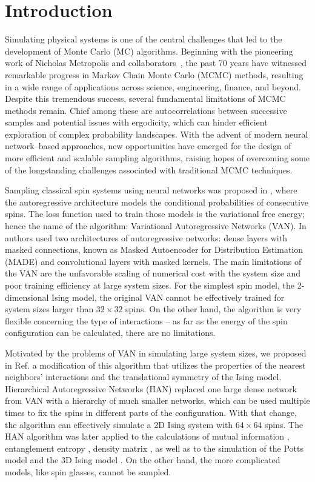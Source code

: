 \documentclass[3p, times,merge]{elsarticle}
\begin{document}
\section{Introduction}
\label{sect_intr}

  Simulating physical systems is one of the central challenges that led to the development of Monte Carlo (MC) algorithms. Beginning with the pioneering work of Nicholas Metropolis and collaborators~\cite{10.1063/1.1699114}, the past 70 years have witnessed remarkable progress in Markov Chain Monte Carlo (MCMC) methods, resulting in a wide range of applications across science, engineering, finance, and beyond.
Despite this tremendous success, several fundamental limitations of MCMC methods remain. Chief among these are autocorrelations between successive samples and potential issues with ergodicity, which can hinder efficient exploration of complex probability landscapes.
With the advent of modern neural network–based approaches, new opportunities have emerged for the design of more efficient and scalable sampling algorithms, raising hopes of overcoming some of the longstanding challenges associated with traditional MCMC techniques.

Sampling classical spin systems using neural networks was proposed in \cite{2019PhRvL.122h0602W}, where the autoregressive architecture models the conditional probabilities of consecutive spins. The loss function used to train those models is the variational free energy; hence the name of the algorithm: Variational Autoregressive Networks (VAN). In \cite{2019PhRvL.122h0602W} authors used two architectures of autoregressive networks: dense layers with masked connections, known as Masked Autoencoder for Distribution Estimation (MADE) \cite{2015arXiv150203509G} and convolutional layers with masked kernels. The main limitations of the VAN are the unfavorable scaling of numerical cost with the system size and poor training efficiency at large system sizes. For the simplest spin model, the 2-dimensional Ising model, the original VAN cannot be effectively trained for system sizes larger than $32\times 32$ spins. On the other hand, the algorithm is very flexible concerning the type of interactions -- as far as the energy of the spin configuration can be calculated, there are no limitations.

Motivated by the problems of VAN in simulating large system sizes, we proposed in Ref.\cite{Bialas:2022qbs} a modification of this algorithm that utilizes the properties of the nearest neighbors' interactions and the translational symmetry of the Ising model. Hierarchical Autoregressive Networks (HAN) replaced one large dense network from VAN with a hierarchy of much smaller networks, which can be used multiple times to fix the spins in different parts of the configuration. With that change, the algorithm can effectively simulate a 2D Ising system with $64 \times 64$ spins. The HAN algorithm was later applied to the calculations of mutual information \cite{Bialas:2023fjz}, entanglement entropy \cite{Bialas:2024gha}, density matrix \cite{Bialas:2025ldp}, as well as to the simulation of the Potts model \cite{Bialas:2022bdl} and the 3D Ising model \cite{Bialas:2025hxu}. On the other hand, the more complicated models, like spin glasses, cannot be sampled. 
\end{document}
